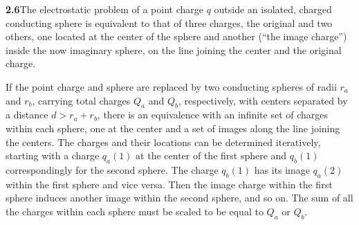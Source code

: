 \par\bigskip
\noindent\textbf{2.6}\quad The electrostatic problem of a point charge $q$ outside an isolated, charged conducting sphere is equivalent to that of three charges, the original and two others, one located at the center of the sphere and another (``the image charge'') inside the now imaginary sphere, on the line joining the center and the original charge.

If the point charge and sphere are replaced by two conducting spheres of radii $r_{a}$ and $r_{b}$, carrying total charges $Q_{a}$ and $Q_{b}$, respectively, with centers separated by a distance $d>r_{a}+r_{b}$, there is an equivalence with an infinite set of charges within each sphere, one at the center and a set of images along the line joining the centers. The charges and their locations can be determined iteratively, starting with a charge $q_{a}(1)$ at the center of the first sphere and $q_{b}(1)$ correspondingly for the second sphere. The charge $q_{b}(1)$ has its image $q_{a}(2)$ within the first sphere and vice versa. Then the image charge within the first sphere induces another image within the second sphere, and so on. The sum of all the charges within each sphere must be scaled to be equal to $Q_{a}$ or $Q_{b}$.

